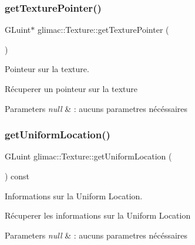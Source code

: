 \subsubsection{\texorpdfstring{get\+Texture\+Pointer()}{getTexturePointer()}}
{\footnotesize\ttfamily G\+Luint$\ast$ glimac\+::\+Texture\+::get\+Texture\+Pointer (\begin{DoxyParamCaption}{ }\end{DoxyParamCaption})\hspace{0.3cm}{\ttfamily [inline]}}



Pointeur sur la texture. 

Récuperer un pointeur sur la texture


\begin{DoxyParams}{Parameters}
{\em null} & \+: aucuns parametres nécéssaires \\
\hline
\end{DoxyParams}
\mbox{\label{classglimac_1_1Texture_aa2628c4f632bc1ec28cb08ca81955df8}} 
\subsubsection{\texorpdfstring{get\+Uniform\+Location()}{getUniformLocation()}}
{\footnotesize\ttfamily G\+Luint glimac\+::\+Texture\+::get\+Uniform\+Location (\begin{DoxyParamCaption}{ }\end{DoxyParamCaption}) const\hspace{0.3cm}{\ttfamily [inline]}}



Informations sur la Uniform Location. 

Récuperer les informations sur la Uniform Location


\begin{DoxyParams}{Parameters}
{\em null} & \+: aucuns parametres nécéssaires \\
\hline
\end{DoxyParams}
\mbox{\label{classglimac_1_1Texture_a412726a887d5b80d6382e0d25584661f}} 
